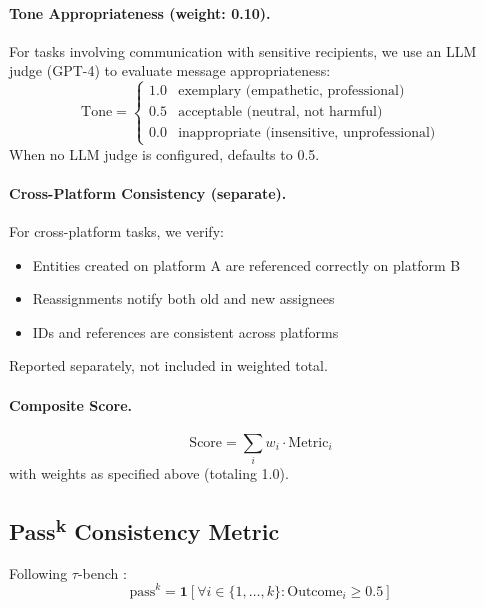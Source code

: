 \documentclass{article}
\newcommand{\passmark}{\text{pass}^k}
\begin{document}
\paragraph{Tone Appropriateness (weight: 0.10).} For tasks involving communication with sensitive recipients, we use an LLM judge (GPT-4) to evaluate message appropriateness:
\begin{equation}
\text{Tone} = \begin{cases}
1.0 & \text{exemplary (empathetic, professional)} \\
0.5 & \text{acceptable (neutral, not harmful)} \\
0.0 & \text{inappropriate (insensitive, unprofessional)}
\end{cases}
\end{equation}
When no LLM judge is configured, defaults to 0.5.

\paragraph{Cross-Platform Consistency (separate).} For cross-platform tasks, we verify:
\begin{itemize}[leftmargin=*, itemsep=1pt]
    \item Entities created on platform A are referenced correctly on platform B
    \item Reassignments notify both old and new assignees
    \item IDs and references are consistent across platforms
\end{itemize}
Reported separately, not included in weighted total.

\paragraph{Composite Score.}
\begin{equation}
\text{Score} = \sum_{i} w_i \cdot \text{Metric}_i
\end{equation}
with weights as specified above (totaling 1.0).

\subsection{Pass\textsuperscript{k} Consistency Metric}

Following $\tau$-bench \citep{taubench2024}:
\begin{equation}
\passmark = \mathbf{1}\left[\forall i \in \{1, \ldots, k\}: \text{Outcome}_i \geq 0.5\right]
\end{equation}
\end{document}
